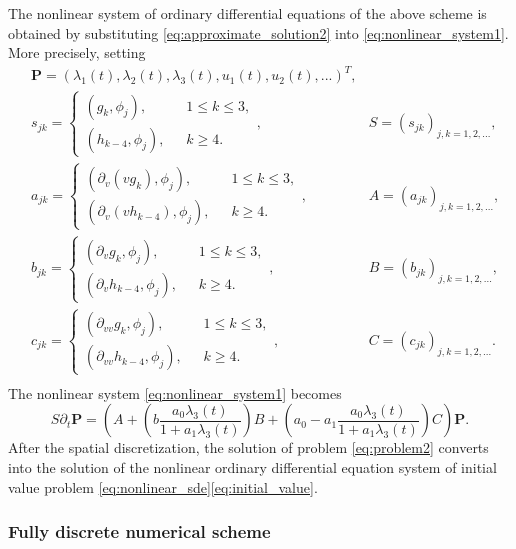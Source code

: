 The nonlinear system of ordinary differential equations of the above scheme is obtained by substituting \eqref{eq:approximate_solution2} into \eqref{eq:nonlinear_system1}. More precisely, setting
\begin{equation}
    \begin{aligned}
        &\mathbf{P}=(\lambda_1(t),\lambda_2(t),\lambda_3(t),u_1(t),u_2(t),...)^T,\\
        &s_{jk}=\begin{cases}
            (g_k,\phi_j),\qquad &1\leq k \leq3,\\
            (h_{k-4},\phi_j),& k\geq4.
        \end{cases}, &S=(s_{jk})_{j,k=1,2,...},\\
        &a_{jk}=\begin{cases}
            (\partial_v(vg_k),\phi_j),\qquad &1\leq k \leq3,\\
            (\partial_v(vh_{k-4}),\phi_j),& k\geq4.
        \end{cases}, &A=(a_{jk})_{j,k=1,2,...},\\
        &b_{jk}=\begin{cases}
            (\partial_vg_k,\phi_j),\qquad &1\leq k \leq3,\\
            (\partial_vh_{k-4},\phi_j),& k\geq4.
        \end{cases}, &B=(b_{jk})_{j,k=1,2,...},\\
        &c_{jk}=\begin{cases}
            (\partial_{vv}g_k,\phi_j),\qquad &1\leq k \leq3,\\
            (\partial_{vv}h_{k-4},\phi_j),& k\geq4.
        \end{cases}, &C=(c_{jk})_{j,k=1,2,...}.\\
    \end{aligned}
\end{equation}
The nonlinear system \eqref{eq:nonlinear_system1} becomes
\begin{equation}
    \label{eq:nonlinear_sde}
    S\partial_t\mathbf{P}=\left(A+\left(b\frac{a_0\lambda_3(t)}{1+a_1\lambda_3(t)}\right)B+\left(a_0-a_1\frac{a_0\lambda_3(t)}{1+a_1\lambda_3(t)}\right)C\right)\mathbf{P}.
\end{equation}
After the spatial discretization, the solution of problem \eqref{eq:problem2} converts into the solution of the nonlinear ordinary differential equation system of initial value problem \eqref{eq:nonlinear_sde}\eqref{eq:initial_value}.

\subsubsection{Fully discrete numerical scheme}

